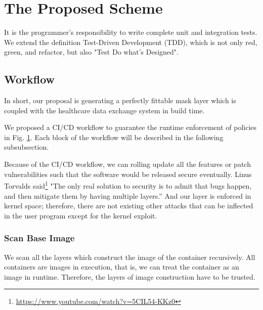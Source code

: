 \section{The Proposed Scheme}
It is the programmer's responsibility to write complete unit and integration tests.
We extend the definition Test-Driven Development (TDD), which is not only red,
green, and refactor, but also "Test Do what's Designed".

\subsection{Workflow}
In short, our proposal is generating a perfectly fittable mask layer which
is coupled with the healthcare data exchange system in build time.

\begin{figure}[h]
    \centering
    \footnotesize
    \label{workflow}
\end{figure}

We proposed a CI/CD workflow to guarantee the runtime enforcement of policies
in Fig. \ref{workflow}. Each block of the workflow will be described
in the following subsubsection.

Because of the CI/CD workflow, we can rolling update all the features or
patch vulnerabilities such that the software would be released secure
eventually. Linus Torvalds said\footnote{\url{https://www.youtube.com/watch?v=5CIL54-KKz0}}
"The only real solution to security is to admit that bugs happen, and
then mitigate them by having multiple layers.” And our layer is enforced
in kernel space; therefore, there are not existing other attacks that can
be inflected in the user program except for the kernel exploit.


\subsubsection{Scan Base Image}
We scan all the layers which construct the image of the container recursively.
All containers are images in execution, that is, we can treat the container
as an image in runtime. Therefore, the layers of image construction have to
be trusted.

